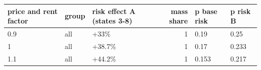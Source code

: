 \begingroup\small
\setlength{\tabcolsep}{3pt}
\renewcommand{\arraystretch}{1.04}
\begin{tabularx}{\linewidth}{XXXrXX}
\toprule
price and rent factor & group & risk effect A (states 3-8) & mass share & p base risk & p risk B \\
\midrule
0.9 & all & +33\% & 1 & 0.19 & 0.25 \\
1 & all & +38.7\% & 1 & 0.17 & 0.233 \\
1.1 & all & +44.2\% & 1 & 0.153 & 0.217 \\
\bottomrule
\end{tabularx}
\endgroup
